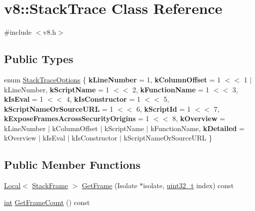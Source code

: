 \hypertarget{classv8_1_1StackTrace}{}\section{v8\+:\+:Stack\+Trace Class Reference}
\label{classv8_1_1StackTrace}


{\ttfamily \#include $<$v8.\+h$>$}

\subsection*{Public Types}
\begin{DoxyCompactItemize}
\item 
enum \mbox{\hyperlink{classv8_1_1StackTrace_a9704e4a37949eb8eb8ccddbddf161492}{Stack\+Trace\+Options}} \{ \newline
{\bfseries k\+Line\+Number} = 1, 
{\bfseries k\+Column\+Offset} = 1 $<$$<$ 1 $\vert$ k\+Line\+Number, 
{\bfseries k\+Script\+Name} = 1 $<$$<$ 2, 
{\bfseries k\+Function\+Name} = 1 $<$$<$ 3, 
\newline
{\bfseries k\+Is\+Eval} = 1 $<$$<$ 4, 
{\bfseries k\+Is\+Constructor} = 1 $<$$<$ 5, 
{\bfseries k\+Script\+Name\+Or\+Source\+U\+RL} = 1 $<$$<$ 6, 
{\bfseries k\+Script\+Id} = 1 $<$$<$ 7, 
\newline
{\bfseries k\+Expose\+Frames\+Across\+Security\+Origins} = 1 $<$$<$ 8, 
{\bfseries k\+Overview} = k\+Line\+Number $\vert$ k\+Column\+Offset $\vert$ k\+Script\+Name $\vert$ k\+Function\+Name, 
{\bfseries k\+Detailed} = k\+Overview $\vert$ k\+Is\+Eval $\vert$ k\+Is\+Constructor $\vert$ k\+Script\+Name\+Or\+Source\+U\+RL
 \}
\end{DoxyCompactItemize}
\subsection*{Public Member Functions}
\begin{DoxyCompactItemize}
\item 
\mbox{\hyperlink{classv8_1_1Local}{Local}}$<$ \mbox{\hyperlink{classv8_1_1StackFrame}{Stack\+Frame}} $>$ \mbox{\hyperlink{classv8_1_1StackTrace_a4d42c17268028c668938cbac427779a8}{Get\+Frame}} (Isolate $\ast$isolate, \mbox{\hyperlink{classuint32__t}{uint32\+\_\+t}} index) const
\item 
\mbox{\hyperlink{classint}{int}} \mbox{\hyperlink{classv8_1_1StackTrace_a97a2010fa998f963df290062a8157849}{Get\+Frame\+Count}} () const
\end{DoxyCompactItemize}
